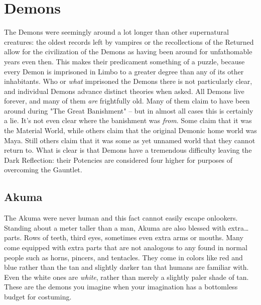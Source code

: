 \section{Demons} 

The Demons were seemingly around a lot longer than other supernatural creatures: the oldest records left by vampires or the recollections of the Returned allow for the civilization of the Demons as having been around for unfathomable years even then. This makes their predicament something of a puzzle, because every Demon is imprisoned in Limbo to a greater degree than any of its other inhabitants. Who or \textit{what} imprisoned the Demons there is not particularly clear, and individual Demons advance distinct theories when asked. All Demons live forever, and many of them \textit{are} frightfully old. Many of them claim to have been around during "The Great Banishment" -- but in almost all cases this is certainly a lie. It's not even clear where the banishment was \textit{from}. Some claim that it was the Material World, while others claim that the original Demonic home world was Maya. Still others claim that it was some as yet unnamed world that they cannot return to. What is clear is that Demons have a tremendous difficulty leaving the Dark Reflection: their Potencies are considered four higher for purposes of overcoming the Gauntlet.

\subsection{Akuma} 

The Akuma were never human and this fact cannot easily escape onlookers. Standing about a meter taller than a man, Akuma are also blessed with extra\ldots{} parts. Rows of teeth, third eyes, sometimes even extra arms or mouths. Many come equipped with extra parts that are not analogous to any found in normal people such as horns, pincers, and tentacles. They come in colors like red and blue rather than the tan and slightly darker tan that humans are familiar with. Even the white ones are \textit{white}, rather than merely a slightly paler shade of tan. These are the demons you imagine when your imagination has a bottomless budget for costuming. 

